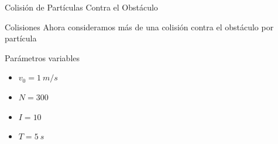 \begin{frame}{Colisión de Partículas Contra el Obstáculo}

    \begin{block}{Colisiones}
        Ahora consideramos más de una colisión contra el obstáculo por partícula
    \end{block}

    \begin{minipage}{0.8\textwidth}
        \begin{block}{Parámetros variables}
            \begin{itemize}
                \item $v_0 = 1\ m/s$
                \item $N = 300$
                \item $I = 10$
                \item $T = 5\ s$
            \end{itemize}
        \end{block}
    \end{minipage}

\end{frame}


